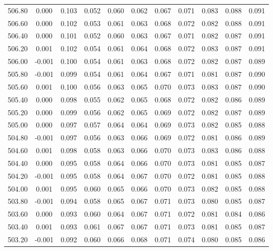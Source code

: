 \begin{longtable}{cccccccccc}
    506.80 &  0.000 &  0.103 &  0.052 &  0.060 &  0.062 &  0.067 &  0.071 &  0.083 &  0.088 &  0.091 \\
    506.60 &  0.000 &  0.102 &  0.053 &  0.061 &  0.063 &  0.068 &  0.072 &  0.082 &  0.088 &  0.091 \\
    506.40 &  0.000 &  0.101 &  0.052 &  0.060 &  0.063 &  0.067 &  0.071 &  0.082 &  0.087 &  0.091 \\
    506.20 &  0.001 &  0.102 &  0.054 &  0.061 &  0.064 &  0.068 &  0.072 &  0.083 &  0.087 &  0.091 \\
    506.00 & -0.001 &  0.100 &  0.054 &  0.061 &  0.063 &  0.068 &  0.072 &  0.082 &  0.087 &  0.089 \\
    505.80 & -0.001 &  0.099 &  0.054 &  0.061 &  0.064 &  0.067 &  0.071 &  0.081 &  0.087 &  0.090 \\
    505.60 &  0.001 &  0.100 &  0.056 &  0.063 &  0.065 &  0.070 &  0.073 &  0.083 &  0.087 &  0.090 \\
    505.40 &  0.000 &  0.098 &  0.055 &  0.062 &  0.065 &  0.068 &  0.072 &  0.082 &  0.086 &  0.089 \\
    505.20 &  0.000 &  0.099 &  0.056 &  0.062 &  0.065 &  0.069 &  0.072 &  0.082 &  0.087 &  0.089 \\
    505.00 &  0.000 &  0.097 &  0.057 &  0.064 &  0.064 &  0.069 &  0.073 &  0.082 &  0.085 &  0.088 \\
    504.80 & -0.001 &  0.097 &  0.056 &  0.063 &  0.066 &  0.069 &  0.072 &  0.081 &  0.086 &  0.089 \\
    504.60 &  0.001 &  0.098 &  0.058 &  0.063 &  0.066 &  0.070 &  0.073 &  0.083 &  0.086 &  0.088 \\
    504.40 &  0.000 &  0.095 &  0.058 &  0.064 &  0.066 &  0.070 &  0.073 &  0.081 &  0.085 &  0.087 \\
    504.20 & -0.001 &  0.095 &  0.058 &  0.064 &  0.067 &  0.070 &  0.072 &  0.081 &  0.085 &  0.088 \\
    504.00 &  0.001 &  0.095 &  0.060 &  0.065 &  0.066 &  0.070 &  0.073 &  0.082 &  0.085 &  0.088 \\
    503.80 & -0.001 &  0.094 &  0.058 &  0.065 &  0.067 &  0.071 &  0.073 &  0.080 &  0.085 &  0.087 \\
    503.60 &  0.000 &  0.093 &  0.060 &  0.064 &  0.067 &  0.071 &  0.072 &  0.081 &  0.084 &  0.086 \\
    503.40 &  0.001 &  0.093 &  0.061 &  0.067 &  0.067 &  0.071 &  0.073 &  0.081 &  0.085 &  0.087 \\
    503.20 & -0.001 &  0.092 &  0.060 &  0.066 &  0.068 &  0.071 &  0.074 &  0.080 &  0.085 &  0.086 \\

\end{longtable}
